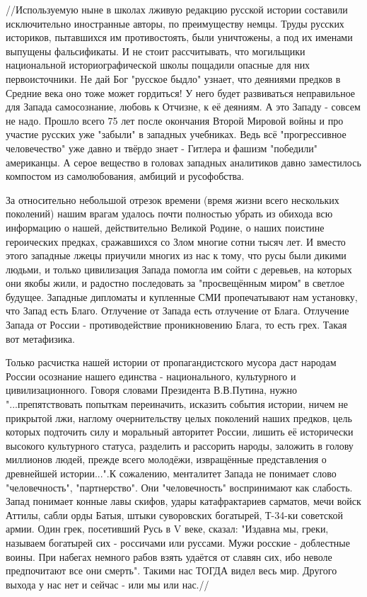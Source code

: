 \begin{itemize}
//Используемую ныне в школах лживую редакцию русской истории составили
исключительно иностранные авторы, по преимуществу немцы. Труды русских
историков, пытавшихся им противостоять, были уничтожены, а под их именами
выпущены фальсификаты. И не стоит рассчитывать, что могильщики национальной
историографической школы пощадили опасные для них первоисточники. Hе дай Бог
"русское быдло" узнает, что деяниями предков в Средние века оно тоже может
гордиться! У него будет развиваться неправильное для Запада самосознание,
любовь к Отчизне, к её деяниям. А это Западу - совсем не надо. Прошло всего 75
лет после окончания Второй Мировой войны и про участие русских уже "забыли" в
западных учебниках. Ведь всё "прогрессивное человечество" уже давно и твёрдо
знает - Гитлера и фашизм "победили" американцы. А серое вещество в головах
западных аналитиков давно заместилось компостом из самолюбования, амбиций и
русофобства.

За относительно небольшой отрезок времени (время жизни всего нескольких
поколений) нашим врагам удалось почти полностью убрать из обихода всю
информацию о нашей, действительно Великой Родине, о наших поистине героических
предках, сражавшихся со Злом многие сотни тысяч лет. И вместо этого западные
лжецы приучили многих из нас к тому, что русы были дикими людьми, и только
цивилизация Запада помогла им сойти с деревьев, на которых они якобы жили, и
радостно последовать за "просвещённым миром" в светлое будущее. Западные
дипломаты и купленные СМИ пропечатывают нам установку, что Запад есть Благо.
Отлучение от Запада есть отлучение от Блага. Отлучение Запада от России -
противодействие проникновению Блага, то есть грех. Такая вот метафизика.

Только расчистка нашей истории от пропагандистского мусора даст народам России
осознание нашего единства - национального, культурного и цивилизационного.
Говоря словами Президента В.В.Путина, нужно "...препятствовать попыткам
переиначить, исказить события истории, ничем не прикрытой лжи, наглому
очернительству целых поколений наших предков, цель которых подточить силу и
моральный авторитет России, лишить её исторически высокого культурного статуса,
разделить и рассорить народы, заложить в голову миллионов людей, прежде всего
молодёжи, извращённые представления о древнейшей истории...".К сожалению,
менталитет Запада не понимает слово "человечность", "партнерство". Они
"человечность" воспринимают как слабость. Запад понимает конные лавы скифов,
удары катафрактариев сарматов, мечи войск Аттилы, сабли орды Батыя, штыки
суворовских богатырей, Т-34-ки советской армии. Один грек, посетивший Русь в V
веке, сказал: "Издавна мы, греки, называем богатырей сих - россичами или
руссами. Мужи росские - доблестные воины. При набегах немного рабов взять
удаётся от славян сих, ибо неволе предпочитают все они смерть". Такими нас
ТОГДА видел весь мир. Другого выхода у нас нет и сейчас - или мы или нас.//


\end{itemize}
